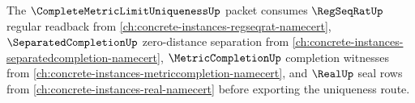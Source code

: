 The $\CompleteMetricLimitUniquenessUp$ packet consumes $\RegSeqRatUp$ regular readback from \autoref{ch:concrete-instances-regseqrat-namecert}, $\SeparatedCompletionUp$ zero-distance separation from \autoref{ch:concrete-instances-separatedcompletion-namecert}, $\MetricCompletionUp$ completion witnesses from \autoref{ch:concrete-instances-metriccompletion-namecert}, and $\RealUp$ seal rows from \autoref{ch:concrete-instances-real-namecert} before exporting the uniqueness route.
